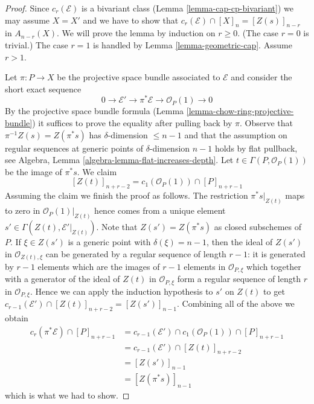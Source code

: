 \begin{proof}
Since $c_r(\mathcal{E})$ is a bivariant class
(Lemma \ref{lemma-cap-cp-bivariant})
we may assume $X = X'$ and we have to show that
$c_r(\mathcal{E}) \cap [X]_n = [Z(s)]_{n - r}$ in $A_{n - r}(X)$.
We will prove the lemma by induction on $r \geq 0$. (The case
$r = 0$ is trivial.) The case $r = 1$
is handled by Lemma \ref{lemma-geometric-cap}. Assume $r > 1$.

\medskip\noindent
Let $\pi : P \to X$ be the projective space bundle associated to
$\mathcal{E}$ and consider the short exact sequence
$$
0 \to \mathcal{E}' \to \pi^*\mathcal{E} \to \mathcal{O}_P(1) \to 0
$$
By the projective space bundle formula
(Lemma \ref{lemma-chow-ring-projective-bundle})
it suffices to prove the equality after pulling back by $\pi$.
Observe that $\pi^{-1}Z(s) = Z(\pi^*s)$ has $\delta$-dimension
$\leq n - 1$ and that the assumption on regular sequences at
generic points of $\delta$-dimension $n - 1$ holds by
flat pullback, see
Algebra, Lemma \ref{algebra-lemma-flat-increases-depth}.
Let $t \in \Gamma(P, \mathcal{O}_P(1))$ be the image of $\pi^*s$.
We claim
$$
[Z(t)]_{n + r - 2} = c_1(\mathcal{O}_P(1)) \cap [P]_{n + r - 1}
$$
Assuming the claim we finish the proof as follows.
The restriction $\pi^*s|_{Z(t)}$ maps to zero in
$\mathcal{O}_P(1)|_{Z(t)}$ hence comes from a unique
element $s' \in \Gamma(Z(t), \mathcal{E}'|_{Z(t)})$.
Note that $Z(s') = Z(\pi^*s)$ as closed subschemes of $P$.
If $\xi \in Z(s')$ is a generic point with $\delta(\xi) = n - 1$,
then the ideal of $Z(s')$ in $\mathcal{O}_{Z(t), \xi}$
can be generated by a regular sequence of length $r - 1$: it is generated by
$r - 1$ elements which are the images of $r - 1$ elements in
$\mathcal{O}_{P, \xi}$ which together with a generator of the
ideal of $Z(t)$ in $\mathcal{O}_{P, \xi}$ form a regular sequence
of length $r$ in $\mathcal{O}_{P, \xi}$. Hence we can apply the
induction hypothesis to $s'$ on $Z(t)$ to get
$c_{r - 1}(\mathcal{E}') \cap [Z(t)]_{n + r - 2} = [Z(s')]_{n - 1}$.
Combining all of the above we obtain
\begin{align*}
c_r(\pi^*\mathcal{E}) \cap [P]_{n + r - 1}
& =
c_{r - 1}(\mathcal{E}') \cap c_1(\mathcal{O}_P(1)) \cap [P]_{n + r - 1} \\
& =
c_{r - 1}(\mathcal{E}') \cap [Z(t)]_{n + r - 2} \\
& =
[Z(s')]_{n - 1} \\
& = [Z(\pi^*s)]_{n - 1}
\end{align*}
which is what we had to show.


\end{proof}
